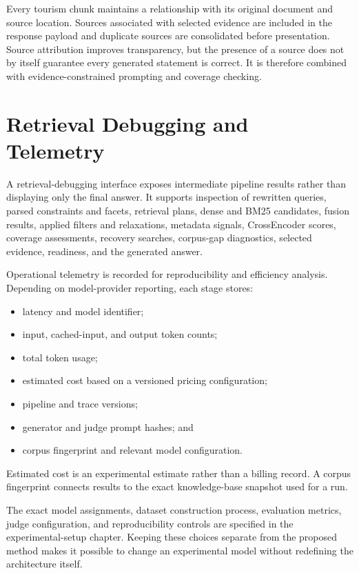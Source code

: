Every tourism chunk maintains a relationship with its original document and
source location. Sources associated with selected evidence are included in the
response payload and duplicate sources are consolidated before presentation.
Source attribution improves transparency, but the presence of a source does
not by itself guarantee every generated statement is correct. It is therefore
combined with evidence-constrained prompting and coverage checking.

\section{Retrieval Debugging and Telemetry}

A retrieval-debugging interface exposes intermediate pipeline results rather
than displaying only the final answer. It supports inspection of rewritten
queries, parsed constraints and facets, retrieval plans, dense and BM25
candidates, fusion results, applied filters and relaxations, metadata signals,
CrossEncoder scores, coverage assessments, recovery searches, corpus-gap
diagnostics, selected evidence, readiness, and the generated answer.

Operational telemetry is recorded for reproducibility and efficiency analysis.
Depending on model-provider reporting, each stage stores:

\begin{itemize}
    \item latency and model identifier;
    \item input, cached-input, and output token counts;
    \item total token usage;
    \item estimated cost based on a versioned pricing configuration;
    \item pipeline and trace versions;
    \item generator and judge prompt hashes; and
    \item corpus fingerprint and relevant model configuration.
\end{itemize}

Estimated cost is an experimental estimate rather than a billing record. A
corpus fingerprint connects results to the exact knowledge-base snapshot used
for a run.

The exact model assignments, dataset construction process, evaluation metrics,
judge configuration, and reproducibility controls are specified in the
experimental-setup chapter. Keeping these choices separate from the proposed
method makes it possible to change an experimental model without redefining the
architecture itself.

